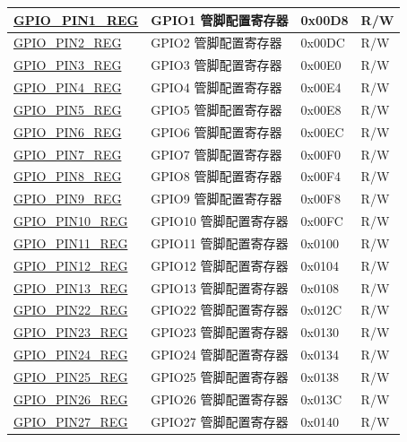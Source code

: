 \begin{longtable}{ | p{6cm} | p{7.2cm} | p{1.3cm} | p{1cm} | }
\hyperref[regdesc:GPIOPINNREG]{GPIO\_PIN1\_REG} & GPIO1 管脚配置寄存器 & 0x00D8 & R/W \\ \hline
\hyperref[regdesc:GPIOPINNREG]{GPIO\_PIN2\_REG} & GPIO2 管脚配置寄存器 & 0x00DC & R/W \\ \hline
\hyperref[regdesc:GPIOPINNREG]{GPIO\_PIN3\_REG} & GPIO3 管脚配置寄存器 & 0x00E0 & R/W \\ \hline
\hyperref[regdesc:GPIOPINNREG]{GPIO\_PIN4\_REG} & GPIO4 管脚配置寄存器 & 0x00E4 & R/W \\ \hline
\hyperref[regdesc:GPIOPINNREG]{GPIO\_PIN5\_REG} & GPIO5 管脚配置寄存器 & 0x00E8 & R/W \\ \hline
\hyperref[regdesc:GPIOPINNREG]{GPIO\_PIN6\_REG} & GPIO6 管脚配置寄存器 & 0x00EC & R/W \\ \hline
\hyperref[regdesc:GPIOPINNREG]{GPIO\_PIN7\_REG} & GPIO7 管脚配置寄存器 & 0x00F0 & R/W \\ \hline
\hyperref[regdesc:GPIOPINNREG]{GPIO\_PIN8\_REG} & GPIO8 管脚配置寄存器 & 0x00F4 & R/W \\ \hline
\hyperref[regdesc:GPIOPINNREG]{GPIO\_PIN9\_REG} & GPIO9 管脚配置寄存器 & 0x00F8 & R/W \\ \hline
\hyperref[regdesc:GPIOPINNREG]{GPIO\_PIN10\_REG} & GPIO10 管脚配置寄存器 & 0x00FC & R/W \\ \hline
\hyperref[regdesc:GPIOPINNREG]{GPIO\_PIN11\_REG} & GPIO11 管脚配置寄存器 & 0x0100 & R/W \\ \hline
\hyperref[regdesc:GPIOPINNREG]{GPIO\_PIN12\_REG} & GPIO12 管脚配置寄存器 & 0x0104 & R/W \\ \hline
\hyperref[regdesc:GPIOPINNREG]{GPIO\_PIN13\_REG} & GPIO13 管脚配置寄存器 & 0x0108 & R/W \\ \hline
\hyperref[regdesc:GPIOPINNREG]{GPIO\_PIN22\_REG} & GPIO22 管脚配置寄存器 & 0x012C & R/W \\ \hline
\hyperref[regdesc:GPIOPINNREG]{GPIO\_PIN23\_REG} & GPIO23 管脚配置寄存器 & 0x0130 & R/W \\ \hline
\hyperref[regdesc:GPIOPINNREG]{GPIO\_PIN24\_REG} & GPIO24 管脚配置寄存器 & 0x0134 & R/W \\ \hline
\hyperref[regdesc:GPIOPINNREG]{GPIO\_PIN25\_REG} & GPIO25 管脚配置寄存器 & 0x0138 & R/W \\ \hline
\hyperref[regdesc:GPIOPINNREG]{GPIO\_PIN26\_REG} & GPIO26 管脚配置寄存器 & 0x013C & R/W \\ \hline
\hyperref[regdesc:GPIOPINNREG]{GPIO\_PIN27\_REG} & GPIO27 管脚配置寄存器 & 0x0140 & R/W \\ \hline

\end{longtable}
